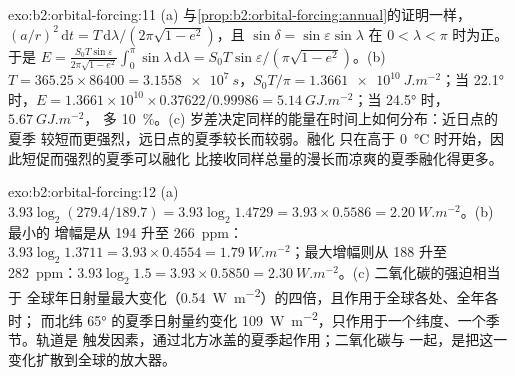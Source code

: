 \begin{solution}{exo:b2:orbital-forcing:11}
(a) 与\cref{prop:b2:orbital-forcing:annual}的证明一样，$(a/r)^2\,\mathrm dt =
T\,\mathrm d\lambda/(2\pi\sqrt{1 - e^2})$，且 $\sin\delta = \sin\varepsilon\sin\lambda$ 在
$0 < \lambda < \pi$ 时为正。于是 $E = \frac{S_0T\sin\varepsilon}{2\pi\sqrt{1 - e^2}}\int_0^{\pi}\sin\lambda
\,\mathrm d\lambda = S_0T\sin\varepsilon/(\pi\sqrt{1 - e^2})$。(b) $T = 365.25 \times 86400 =
\qty{3.1558e7}{s}$，$S_0T/\pi = \qty{1.3661e10}{J.m^{-2}}$；当 \ang{22.1} 时，$E = 1.3661 \times 10^{10}
\times 0.37622/0.99986 = \qty{5.14}{GJ.m^{-2}}$；当 \ang{24.5} 时，$\qty{5.67}{GJ.m^{-2}}$，
多 \qty{10}{\percent}。(c) 岁差决定同样的能量在时间上如何分布：近日点的夏季
较短而更强烈，远日点的夏季较长而较弱。融化
只在高于 \qty{0}{\celsius} 时开始，因此短促而强烈的夏季可以融化
比接收同样总量的漫长而凉爽的夏季融化得更多。
\end{solution}

\begin{solution}{exo:b2:orbital-forcing:12}
(a) $3.93\log_2(279.4/189.7) = 3.93\log_2 1.4729 = 3.93 \times 0.5586 = \qty{2.20}{W.m^{-2}}$。(b) 最小的
增幅是从 194 升至 \qty{266}{ppm}：$3.93\log_2 1.3711 = 3.93 \times 0.4554 =
\qty{1.79}{W.m^{-2}}$；最大增幅则从 188 升至 \qty{282}{ppm}：$3.93\log_2 1.5 = 3.93 \times 0.5850 =
\qty{2.30}{W.m^{-2}}$。(c) 二氧化碳的强迫相当于
全球年日射量最大变化（\qty{0.54}{W.m^{-2}}）的四倍，且作用于全球各处、全年各时；
而北纬 \ang{65} 的夏季日射量约变化 \qty{109}{W.m^{-2}}，只作用于一个纬度、一个季节。轨道是
触发因素，通过北方冰盖的夏季起作用；二氧化碳与
一起，是把这一变化扩散到全球的放大器。
\end{solution}


